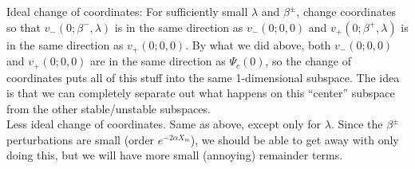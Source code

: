 \documentclass[12pt]{article}
\begin{document}
Ideal change of coordinates: For sufficiently small $\lambda$ and $\beta^\pm$, change coordinates so that $v_-(0; \beta^-, \lambda)$ is in the same direction as $v_-(0; 0, 0)$ and $v_+(0; \beta^+, \lambda)$ is in the same direction as $v_+(0; 0, 0)$. By what we did above, both $v_-(0; 0, 0)$ and $v_+(0; 0, 0)$ are in the same direction as $\Psi_c(0)$, so the change of coordinates puts all of this stuff into the same 1-dimensional subspace. The idea is that we can completely separate out what happens on this ``center'' subspace from the other stable/unstable subspaces.\\

Less ideal change of coordinates. Same as above, except only for $\lambda$. Since the $\beta^\pm$ perturbations are small (order $e^{-2\alpha X_m}$), we should be able to get away with only doing this, but we will have more small (annoying) remainder terms.
\end{document}
